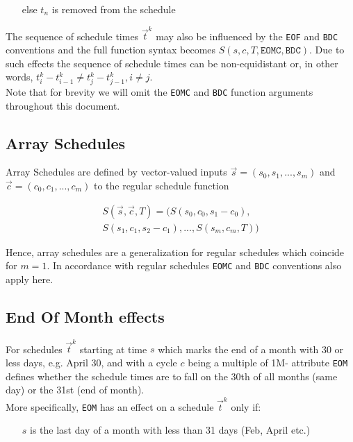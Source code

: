 \documentclass[9pt,oneside]{amsart}
\newcommand{\attr}[1]{\texttt{#1}}
\newcommand{\sdl}[3]{S(#1,#2,#3)}
\begin{document}
\begin{multicols}{2}
\begin{itemize}
	\item[else] $t_n$ is removed from the schedule
\end{itemize}

The sequence of schedule times $\vec{t}^k$ may also be influenced by the \attr{EOF} and \attr{BDC} conventions and the full function syntax becomes $\sdl{s}{c}{T, \attr{EOMC}, \attr{BDC}}$. Due to such effects the sequence of schedule times can be non-equidistant or, in other words, $t_i^k-t_{i-1}^k\neq t_j^k-t_{j-1}^k, i\neq j$.\\

Note that for brevity we will omit the \attr{EOMC} and \attr{BDC} function arguments throughout this document.


\subsection{Array Schedules}

Array Schedules are defined by vector-valued inputs $\vec{s}=(s_0,s_1,...,s_m)$ and $\vec{c}=(c_0,c_1,...,c_m)$ to the regular schedule function

\begin{multline*}
	\sdl{\vec{s}}{\vec{c}}{T} = (\sdl{s_0}{c_0}{s_1-c_0},\\
					\sdl{s_1}{c_1}{s_2-c_1},...,\sdl{s_m}{c_m}{T})
\end{multline*}


Hence, array schedules are a generalization for regular schedules which coincide for $m=1$. In accordance with regular schedules \attr{EOMC} and \attr{BDC} conventions also apply here.


\subsection{End Of Month effects}

For schedules $\vec{t}^k$ starting at time $s$ which marks the end of a month with 30 or less days, e.g. April 30, and with a cycle $c$ being a multiple of 1M- attribute \attr{EOM} defines whether the schedule times are to fall on the 30th of all months (same day) or the 31st (end of month).\\ 

More specifically, \attr{EOM} has an effect on a schedule $\vec{t}^k$ only if:

\begin{itemize}
	\item[$s$] is the last day of a month with less than 31 days (Feb, April etc.)


\end{itemize}
\end{multicols}
\end{document}
